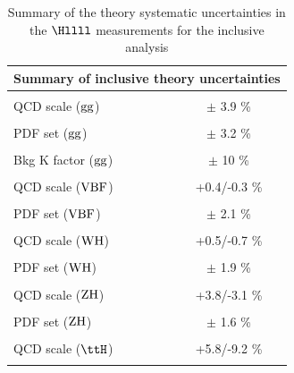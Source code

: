 \begin{table}[!htb]
\begin{center}
\small
\label{tab:SystOverviewTheo}
\caption{Summary of the theory systematic uncertainties in the $\Hllll$ measurements for the inclusive analysis}
\begin{tabular}{|lc|}
\hline %
\hline %
\multicolumn{2}{|c|}{\textbf{Summary of inclusive theory uncertainties}} \\
\hline %
\hline %
\vspace{-0.4cm} & \\
QCD scale (${\rm gg}$) & $\pm$ 3.9 \% \\
\vspace{-0.4cm} & \\
PDF set (${\rm gg}$) & $\pm$ 3.2 \% \\
\vspace{-0.4cm} & \\
Bkg K factor (${\rm gg}$) & $\pm$ 10 \% \\
\vspace{-0.4cm} & \\
QCD scale (${\rm VBF}$) & +0.4/-0.3 \% \\
\vspace{-0.4cm} & \\
PDF set (${\rm VBF}$) & $\pm$ 2.1 \% \\
\vspace{-0.4cm} & \\
QCD scale (${\rm WH}$) & +0.5/-0.7 \% \\
\vspace{-0.4cm} & \\
PDF set (${\rm WH}$) & $\pm$ 1.9 \% \\
\vspace{-0.4cm} & \\
QCD scale (${\rm ZH}$) & +3.8/-3.1 \% \\
\vspace{-0.4cm} & \\
PDF set (${\rm ZH}$) & $\pm$ 1.6 \% \\
\vspace{-0.4cm} & \\
QCD scale (${\rm \ttH}$) & +5.8/-9.2 \% \\
\vspace{-0.4cm} & \\

\end{tabular}
\end{center}
\end{table}
